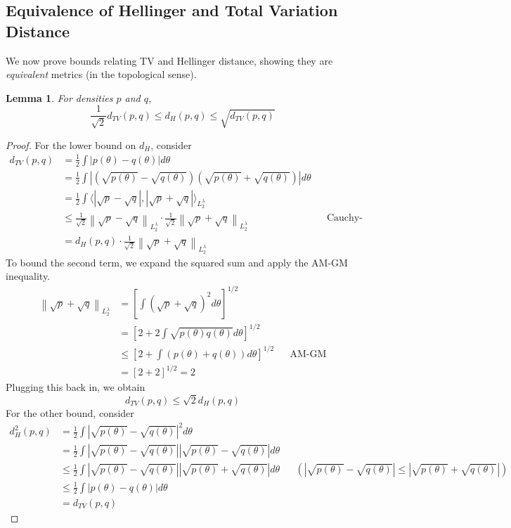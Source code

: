 \documentclass[12pt]{article}
\newcommand*{\norm}[1]{\left\lVert#1\right\rVert}
\newcommand*{\abs}[1]{\left\lvert#1\right\rvert}
\newtheorem{lemma}{Lemma}
\begin{document}
\subsection{Equivalence of Hellinger and Total Variation Distance}
We now prove bounds relating TV and Hellinger distance, showing they are \textit{equivalent} metrics (in the topological sense). 

\begin{lemma} 
For densities $p$ and $q$, 
\[\frac{1}{\sqrt{2}} d_{TV}(p, q) \leq d_H(p, q) \leq \sqrt{d_{TV}(p, q)}\]
\end{lemma}

\begin{proof}
For the lower bound on $d_H$, consider 
\begin{align*}
d_{TV}(p, q) &= \frac{1}{2} \int \abs{p(\theta) - q(\theta)} d\theta \\
		    &= \frac{1}{2} \int \abs{\left(\sqrt{p(\theta)} - \sqrt{q(\theta)}\right) \left(\sqrt{p(\theta)} + \sqrt{q(\theta)}\right)} d\theta \\
		    &= \frac{1}{2} \int \langle \abs{\sqrt{p} - \sqrt{q}}, \abs{\sqrt{p} + \sqrt{q}} \rangle_{L_2^\lambda} \\
		    &\leq \frac{1}{\sqrt{2}} \norm{\sqrt{p} - \sqrt{q}}_{L_2^\lambda} \cdot \frac{1}{\sqrt{2}} \norm{\sqrt{p} + \sqrt{q}}_{L_2^\lambda} && \text{Cauchy-Schwarz} \\
		    &= d_H(p, q) \cdot \frac{1}{\sqrt{2}} \norm{\sqrt{p} + \sqrt{q}}_{L_2^\lambda} 
\end{align*}
To bound the second term, we expand the squared sum and apply the AM-GM inequality. 
\begin{align*}
 \norm{\sqrt{p} + \sqrt{q}}_{L_2^\lambda}  &= \left[ \int (\sqrt{p} + \sqrt{q})^2 d\theta  \right]^{1/2} \\
 							        &=  \left[ 2 + 2\int \sqrt{p(\theta)q(\theta)}  d\theta  \right]^{1/2} \\
							        &\leq \left[ 2 + \int (p(\theta) + q(\theta)) d\theta  \right]^{1/2} && \text{AM-GM} \\
							        &= \left[2 +  2 \right]^{1/2} = 2
\end{align*}
Plugging this back in, we obtain
\[d_{TV}(p, q) \leq \sqrt{2} d_H(p, q)\]
For the other bound, consider 
\begin{align*}
d^2_{H}(p, q) &= \frac{1}{2} \int \abs{\sqrt{p(\theta)} - \sqrt{q(\theta)}}^2 d\theta \\
		     &=  \frac{1}{2} \int \abs{\sqrt{p(\theta)} - \sqrt{q(\theta)}} \abs{\sqrt{p(\theta)} - \sqrt{q(\theta)}} d\theta \\
		     &\leq \frac{1}{2} \int \abs{\sqrt{p(\theta)} - \sqrt{q(\theta)}} \abs{\sqrt{p(\theta)} + \sqrt{q(\theta)}} d\theta  && \left(\abs{\sqrt{p(\theta)} - \sqrt{q(\theta)}}  \leq \abs{\sqrt{p(\theta)} + \sqrt{q(\theta)}}\right) \\
		     &\leq \frac{1}{2} \int \abs{p(\theta) - q(\theta)} d\theta \\
		     &= d_{TV}(p, q)
\end{align*}
\end{proof}
\end{document}
